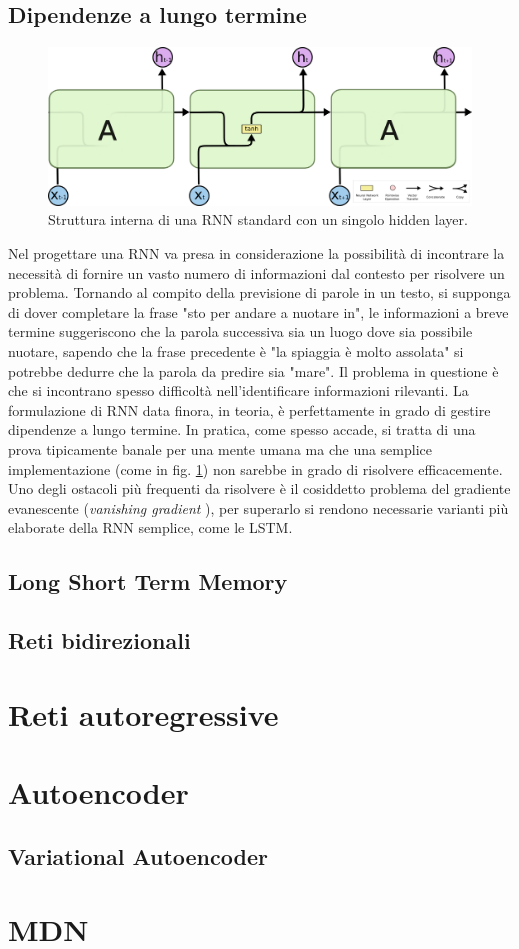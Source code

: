 \subsection{Dipendenze a lungo termine} %
\label{sub:dipendenze_a_lungo_termine}
\begin{figure}[h]
	\centering
	\includegraphics{img/rnn_struct.png}
	\caption{Struttura interna di una RNN standard con un singolo hidden layer.}
	\label{fig:1.8}
\end{figure}
Nel progettare una RNN va presa in considerazione la possibilità di incontrare la necessità di fornire un vasto numero di informazioni dal contesto per risolvere un problema. Tornando al compito della previsione di parole in un testo, si supponga di dover completare la frase "sto per andare a nuotare in", le informazioni a breve termine suggeriscono che la parola successiva sia un luogo dove sia possibile nuotare, sapendo che la frase precedente è "la spiaggia è molto assolata" si potrebbe dedurre che la parola da predire sia "mare". Il problema in questione è che si incontrano spesso difficoltà nell'identificare informazioni rilevanti. La formulazione di RNN data finora, in teoria, è perfettamente in grado di gestire dipendenze a lungo termine. In pratica, come spesso accade, si tratta di una prova tipicamente banale per una mente umana ma che una semplice implementazione (come in fig. \ref{fig:1.8}) non sarebbe in grado di risolvere efficacemente. Uno degli ostacoli più frequenti da risolvere è il cosiddetto problema del gradiente evanescente (\textit{vanishing gradient} \cite{vanishing}), per superarlo si rendono necessarie varianti più elaborate della RNN semplice, come le LSTM.
\subsection{Long Short Term Memory}
\subsection{Reti bidirezionali}
\section{Reti autoregressive}
\section{Autoencoder}
\subsection{Variational Autoencoder}
\section{MDN}